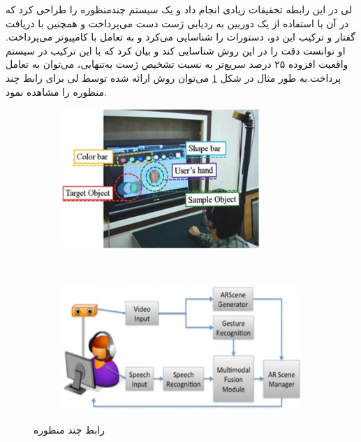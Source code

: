 لی در این رابطه تحقیقات زیادی انجام داد و یک سیستم چندمنظوره را طراحی کرد که در آن با استفاده از یک دوربین به  ردیابی ژست دست می‌پرداخت و همچنین با دریافت گفتار و ترکیب این دو، دستورات را شناسایی می‌کرد و به تعامل با کامپیوتر می‌پرداخت.
او توانست دقت را در این روش شناسایی کند و بیان کرد که با این ترکیب در سیستم واقعیت افزوده ۲۵ درصد سریع‌تر به نسبت تشخیص ژست به‌تنهایی، می‌توان به تعامل پرداخت\cite{Lee2}.به طور مثال  در شکل   \ref{fig:lee2} می‌توان روش ارائه شده توسط لی برای رابط چند منظوره را مشاهده نمود.

\begin{figure}[!ht]
	\centering
	\begin{subfigure}[b]{0.5\textwidth}
		\includegraphics[width=\textwidth]{image/lee2}
		
		
	\end{subfigure}
	~ %
	\begin{subfigure}[b]{0.4\textwidth}
		\includegraphics[width=\textwidth]{image/lee1}
		
	\end{subfigure}
	\caption{رابط چند منظوره\cite{Lee2}}\label{fig:lee2}
\end{figure}


